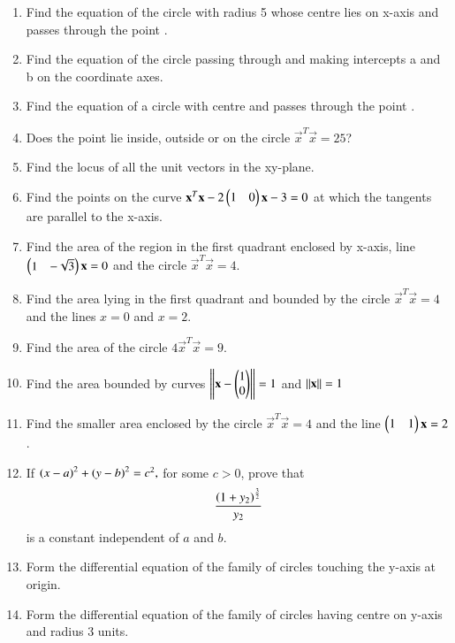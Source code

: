 \begin{enumerate}[label=\arabic*.,ref=\thesubsection.\theenumi]
\item Find the equation of the circle with radius 5 whose centre lies on x-axis and passes through the point .
\item Find the equation of the circle passing through  and making intercepts a and b on the coordinate axes.
\item Find the equation of a circle with centre  and passes through the point . 
\item  Does the point  lie inside, outside or on the circle $\vec{x}^T\vec{x} = 25$?
\item Find the locus of all the unit vectors in the xy-plane.
%
\item Find the points on the curve $\mathbf{x}^T\mathbf{x}-2\begin{pmatrix}1 & 0\end{pmatrix}\mathbf{x} -3 =0$  at which the tangents are parallel to the x-axis.
%
\item  Find the area of the region in the first quadrant enclosed by x-axis, line $\begin{pmatrix}1 & -\sqrt{3}\end{pmatrix}\mathbf{x} =0$ and the circle $\vec{x}^T\vec{x}=4$.
%
\item Find the area lying in the first quadrant and bounded by the circle $\vec{x}^T\vec{x}=4$ and the lines $x = 0$ and $x = 2$.
%
\item Find the area of the circle $4\vec{x}^T\vec{x}=9$.
\item  Find the area bounded by curves $\left\lVert\mathbf{x}-\begin{pmatrix}1\\0\end{pmatrix}\right\rVert = 1$ and $\left\lVert\mathbf{x}\right\rVert=1$
\item Find the smaller area enclosed by the circle $\vec{x}^T\vec{x}=4$ and the line $\begin{pmatrix}1 & 1\end{pmatrix}\mathbf{x} = 2$.
%
\item If 
$
\left(x-a\right)^2+\left(y-b\right)^2 = c^2,
$
for some $c > 0$, prove that 
\begin{align}
\frac{\left(1+y_2\right)^\frac{3}{2}}{y_2}
\end{align}
%
is a constant independent of $a$ and $b$.
%
\item Form the differential equation of the family of circles touching the y-axis at origin.
\item Form the differential equation of the family of circles having centre on y-axis and radius 3 units.
\end{enumerate}
